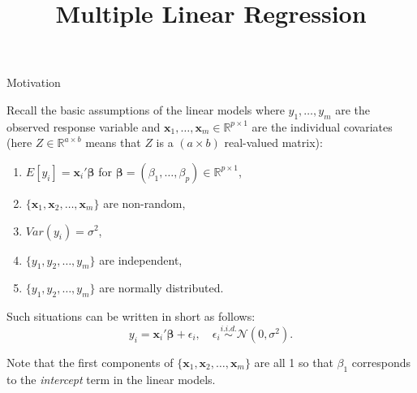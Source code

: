 \documentclass[ignorenonframetext,]{beamer}
\title{Multiple Linear Regression}
\begin{document}
\frame{\titlepage}



\begin{frame}{Motivation}

Recall the basic assumptions of the linear models where $y_1,\ldots,y_m$ are the observed response variable and $\mathbf{x}_1,\ldots, \mathbf{x}_m \in \mathbb{R}^{p \times 1}$ are the individual covariates  (here $Z \in \mathbb{R}^{a \times b}$ means that $Z$ is a $(a \times b)$ real-valued matrix):
\begin{enumerate}
	\item $E[y_i] = \mathbf{x}_i' \bm{\beta}$ for $\bm{\beta} = (\beta_1, \ldots, \beta_p) \in \mathbb{R}^{p\times 1}$,
	\item $ \{\mathbf{x}_1, \mathbf{x}_2, \ldots, \mathbf{x}_m \}$ are non-random,
	\item $Var(y_i) = \sigma^2$,
	\item $\{ y_1, y_2, \ldots, y_m  \}$ are independent,
	\item $\{ y_1, y_2, \ldots, y_m \}$ are normally distributed.
\end{enumerate}
Such situations can be written in short as follows:
\begin{equation} \label{eq:linmod}
y_i = \mathbf{x}_i' \bm{\beta}  + \epsilon_i, \quad \epsilon_i \overset{i.i.d.}\sim \mathcal{N}(0, \sigma^2).
\end{equation}

Note that the first components of $ \{\mathbf{x}_1, \mathbf{x}_2, \ldots, \mathbf{x}_m \}$ are all 1 so that $\beta_1$ corresponds to the \emph{intercept} term in the linear models.

\end{frame}
\end{document}
